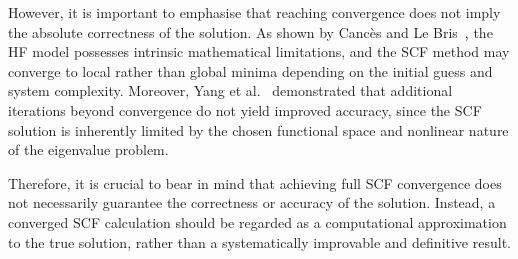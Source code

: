 \newpage
However, it is important to emphasise that reaching convergence
does not imply the absolute correctness of the solution. As shown by Cancès and
Le Bris~\cite{Echenique2007}, the \gls{HF} model possesses intrinsic mathematical
limitations, and the \gls{SCF} method may converge to local rather than global minima
depending on the initial guess and system complexity. Moreover, Yang et
al.~\cite{Yang2009} demonstrated that additional iterations beyond convergence
do not yield improved accuracy, since the \gls{SCF} solution is inherently limited by
the chosen functional space and nonlinear nature of the eigenvalue problem.

Therefore, it is crucial to bear in mind that achieving full \gls{SCF}
convergence does not necessarily guarantee the correctness or accuracy of the
solution. Instead, a converged \gls{SCF} calculation should be regarded as a
computational approximation to the true solution, rather than a systematically
improvable and definitive result.

